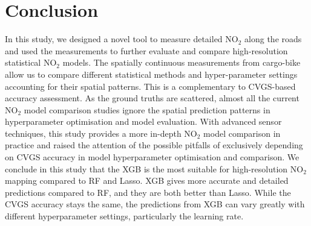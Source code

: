 \documentclass{article}
\begin{document}
\section{Conclusion}
In this study, we designed a novel tool to measure detailed NO$_2$ along the roads and used the measurements to further evaluate and compare high-resolution statistical NO$_2$ models.  The spatially continuous measurements from cargo-bike allow us to compare different statistical methods and hyper-parameter settings accounting for their spatial patterns. This is a complementary to CVGS-based accuracy assessment. As the ground truths are scattered, almost all the current NO$_2$ model comparison studies ignore the spatial prediction patterns in hyperparameter optimisation and model evaluation. With advanced sensor techniques, this study provides a more in-depth NO$_2$ model comparison in practice and raised the attention of the possible pitfalls of exclusively depending on CVGS accuracy in model hyperparameter optimisation and comparison. We conclude in this study that the XGB is the most suitable for high-resolution NO$_2$ mapping compared to RF and Lasso. XGB gives more accurate and detailed predictions compared to RF, and they are both better than Lasso. While the CVGS accuracy stays the same, the predictions from XGB can vary greatly with different hyperparameter settings, particularly the learning rate.    
\newpage


\end{document}
